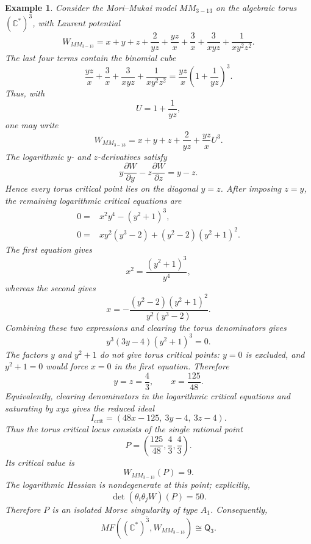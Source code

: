 \documentclass[11pt]{amsart}
\newtheorem{example}{Example}[section]
\newcommand{\MorseCat}[1]{\mathsf{Q}_{#1}}
\begin{document}
\begin{example}
Consider the Mori--Mukai model $MM_{3-13}$ on the algebraic torus
$(\mathbb{C}^*)^3$, with Laurent potential
\[
W_{MM_{3-13}}=x+y+z+\frac{2}{yz}+\frac{yz}{x}
+\frac{3}{x}+\frac{3}{xyz}+\frac{1}{xy^2z^2}.
\]
The last four terms contain the binomial cube
\[
\frac{yz}{x}+\frac{3}{x}+\frac{3}{xyz}+\frac{1}{xy^2z^2}
=\frac{yz}{x}\left(1+\frac{1}{yz}\right)^3.
\]
Thus, with
\[
U=1+\frac{1}{yz},
\]
one may write
\[
W_{MM_{3-13}}=x+y+z+\frac{2}{yz}+\frac{yz}{x}U^3.
\]
The logarithmic $y$- and $z$-derivatives satisfy
\[
y\frac{\partial W}{\partial y}-z\frac{\partial W}{\partial z}=y-z.
\]
Hence every torus critical point lies on the diagonal $y=z$. After imposing
$z=y$, the remaining logarithmic critical equations are
\begin{align*}
0={}&x^2y^4-(y^2+1)^3, \\
0={}&xy^2(y^3-2)+(y^2-2)(y^2+1)^2.
\end{align*}
The first equation gives
\[
x^2=\frac{(y^2+1)^3}{y^4},
\]
whereas the second gives
\[
x=-\frac{(y^2-2)(y^2+1)^2}{y^2(y^3-2)}.
\]
Combining these two expressions and clearing the torus denominators gives
\[
y^3(3y-4)(y^2+1)^3=0.
\]
The factors $y$ and $y^2+1$ do not give torus critical points: $y=0$ is
excluded, and $y^2+1=0$ would force $x=0$ in the first equation. Therefore
\[
y=z=\frac{4}{3},
\qquad
x=\frac{125}{48}.
\]
Equivalently, clearing denominators in the logarithmic critical equations and
saturating by $xyz$ gives the reduced ideal
\[
I_{\mathrm{crit}}=(48x-125,\ 3y-4,\ 3z-4).
\]
Thus the torus critical locus consists of the single rational point
\[
P=\left(\frac{125}{48},\frac{4}{3},\frac{4}{3}\right).
\]
Its critical value is
\[
W_{MM_{3-13}}(P)=9.
\]
The logarithmic Hessian is nondegenerate at this point; explicitly,
\[
\det(\theta_i\theta_jW)(P)=50.
\]
Therefore $P$ is an isolated Morse singularity of type $A_1$. Consequently,
\[
\overline{MF((\mathbb{C}^*)^3,W_{MM_{3-13}})}
\cong \MorseCat{3}.
\]
\end{example}
\end{document}
